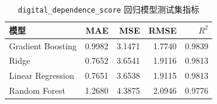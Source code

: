\begin{table}[H]
\centering
\caption{\texttt{digital\_dependence\_score} 回归模型测试集指标}
\label{tab:regression-digital-dependence}
\begin{tabular}{lrrrr}
\toprule
模型 & MAE & MSE & RMSE & $R^2$ \\
\midrule
Gradient Boosting & 0.9982 & 3.1471 & 1.7740 & 0.9839 \\
Ridge & 0.7652 & 3.6541 & 1.9116 & 0.9813 \\
Linear Regression & 0.7651 & 3.6538 & 1.9115 & 0.9813 \\
Random Forest & 1.2680 & 4.3875 & 2.0946 & 0.9776 \\
\bottomrule
\end{tabular}
\end{table}
